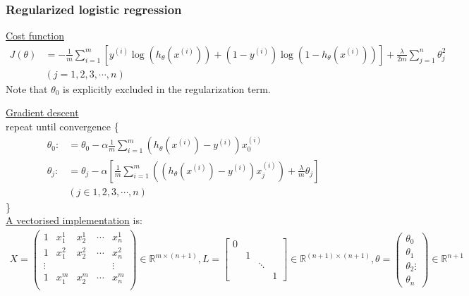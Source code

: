 \subsubsection{Regularized logistic regression}

\underline{Cost function}
   \begin{align} 
        J(\theta) &= -\frac{1}{m}\sum_{i=1}^m \left[ y^{(i)}\log(h_\theta(x^{(i)})) + (1-y^{(i)})\log(1- h_\theta(x^{(i)})) \right] + \frac{\lambda}{2m}\sum_{j=1}^n\theta_j^2 \\
        &(j=1, 2, 3, \cdots, n) \nonumber
    \end{align}
Note that $\theta_0$ is explicitly excluded in the regularization term.

\underline{Gradient descent}\\
repeat until convergence \{ \\
\begin{align*} 
\theta_0: &= \theta_0 - \alpha \frac{1}{m} \sum_{i=1}^m (h_\theta(x^{(i)}) - y^{(i)})x_0^{(i)}\\
\theta_j: &= \theta_j - \alpha \left[\frac{1}{m} \sum_{i=1}^m ((h_\theta(x^{(i)}) - y^{(i)})x^{(i)}_j) + \frac{\lambda}{m}\theta_j \right]\\
&(j \in {1, 2, 3, \cdots, n})
\end{align*}
\}\\

\underline{A vectorised implementation} is:\\
\begin{align*}
X = \begin{pmatrix} 
    1 & x_1^1 & x_2^1 & \cdots & x_n^1 \\
    1 & x_1^2 & x_2^2 & \cdots & x_n^2 \\
    \vdots &&&& \vdots \\
    1 & x_1^m & x_2^m & \cdots & x_n^m \\
     \end{pmatrix} 
\in \mathbb{R}^{m \times (n+1)},
L = \begin{bmatrix}
   0 &  &  & \\ 
   & 1 &  & \\ 
   &  &  \ddots & \\ 
   &  &   & 1
\end{bmatrix}
\in \mathbb{R}^{(n+1)\times(n+1)},
\theta = \begin{pmatrix} \theta_0 \\ \theta_1 \\ \theta_2 \vdots \\ \theta_n \end{pmatrix}
\in \mathbb{R}^{n+1}
\end{align*}

